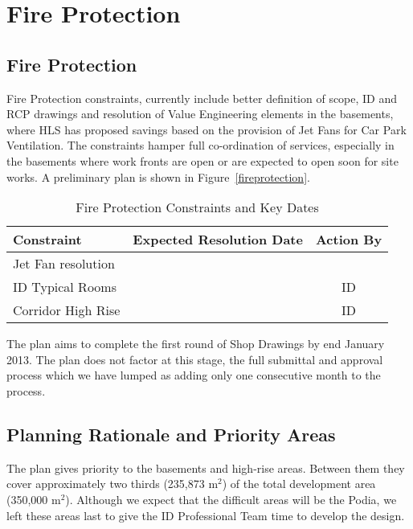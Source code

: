 \documentclass[a4paper]{book}
\begin{document}
\chapter{Fire Protection}
\section{Fire Protection}

Fire Protection constraints, currently include better definition of scope, ID and RCP drawings and resolution of Value Engineering elements in the basements, where HLS has proposed savings based on the provision of Jet Fans for Car Park Ventilation. The constraints hamper full co-ordination of services, especially in the basements where work fronts are open or are expected to open soon for site works. A preliminary plan is shown in Figure~\ref{fireprotection}.
\begin{table}[h]
\caption{Fire Protection Constraints and Key Dates}
\begin{tabular}{llc}
\toprule
Constraint         & Expected Resolution Date & Action By\\
\midrule
Jet Fan resolution & &\\
ID Typical Rooms   & & ID\\
Corridor High Rise & & ID\\
\bottomrule
\end{tabular}
\end{table}

The plan aims to complete the first round of Shop Drawings by end January 2013. The plan does not factor at this stage, the full submittal and approval process which we have lumped as adding only one consecutive month to the process.

\section{Planning Rationale and Priority Areas}

The plan gives priority to the basements and high-rise areas. Between them they cover approximately  two thirds (235,873 m$^2$) of the total development area (350,000 m$^2$). Although we expect that the difficult areas will be the Podia, we left these areas last to give the ID Professional Team time to develop the design. 





\pagestyle{empty}
\end{document}
